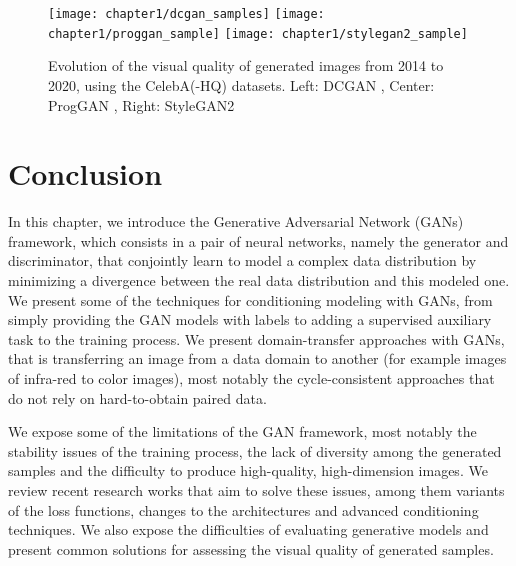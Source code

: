 \begin{figure}
	\centering
	\texttt{[image: chapter1/dcgan\_samples]}	\texttt{[image: chapter1/proggan\_sample]}	\texttt{[image: chapter1/stylegan2\_sample]}
	\caption[Evolution of the visual quality of generated images]{Evolution of the visual quality of generated images from 2014 to 2020, using the CelebA(-HQ) \citep{Liu2015} datasets. Left: DCGAN \citep{Radford2015}, Center: ProgGAN \citep{Karras2017}, Right: StyleGAN2 \citep{Karras2020}}
\end{figure}

\section{Conclusion}

In this chapter, we introduce the Generative Adversarial Network (\ac{GANs}) framework, which consists in a pair of neural networks, namely the generator and discriminator, that conjointly learn to model a complex data distribution by minimizing a divergence between the real data distribution and this modeled one. We present some of the techniques for conditioning modeling with GANs, from simply providing the GAN models with labels to adding a supervised auxiliary task to the training process. We present domain-transfer approaches with GANs, that is transferring an image from a data domain to another (for example images of infra-red to color images), most notably the cycle-consistent approaches that do not rely on hard-to-obtain paired data. 

We expose some of the limitations of the GAN framework, most notably the stability issues of the training process, the lack of diversity among the generated samples and the difficulty to produce high-quality, high-dimension images.  We review recent research works that aim to solve these issues, among them variants of the loss functions, changes to the architectures and advanced conditioning techniques. We also expose the difficulties of evaluating generative models and present common solutions for assessing the visual quality of generated samples.






